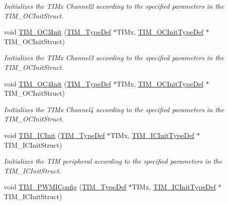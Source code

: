 \begin{DoxyCompactItemize}
\begin{DoxyCompactList}\small\item\em Initializes the T\+I\+Mx Channel2 according to the specified parameters in the T\+I\+M\+\_\+\+O\+C\+Init\+Struct. \end{DoxyCompactList}\item 
void \mbox{\hyperlink{group___t_i_m___exported___functions_ga90d4a358d4e6d4c5ed17dc1d6beb5f30}{T\+I\+M\+\_\+\+O\+C3\+Init}} (\mbox{\hyperlink{struct_t_i_m___type_def}{T\+I\+M\+\_\+\+Type\+Def}} $\ast$T\+I\+Mx, \mbox{\hyperlink{struct_t_i_m___o_c_init_type_def}{T\+I\+M\+\_\+\+O\+C\+Init\+Type\+Def}} $\ast$T\+I\+M\+\_\+\+O\+C\+Init\+Struct)
\begin{DoxyCompactList}\small\item\em Initializes the T\+I\+Mx Channel3 according to the specified parameters in the T\+I\+M\+\_\+\+O\+C\+Init\+Struct. \end{DoxyCompactList}\item 
void \mbox{\hyperlink{group___t_i_m___exported___functions_ga64571ebbb58cac39a9e760050175f11c}{T\+I\+M\+\_\+\+O\+C4\+Init}} (\mbox{\hyperlink{struct_t_i_m___type_def}{T\+I\+M\+\_\+\+Type\+Def}} $\ast$T\+I\+Mx, \mbox{\hyperlink{struct_t_i_m___o_c_init_type_def}{T\+I\+M\+\_\+\+O\+C\+Init\+Type\+Def}} $\ast$T\+I\+M\+\_\+\+O\+C\+Init\+Struct)
\begin{DoxyCompactList}\small\item\em Initializes the T\+I\+Mx Channel4 according to the specified parameters in the T\+I\+M\+\_\+\+O\+C\+Init\+Struct. \end{DoxyCompactList}\item 
void \mbox{\hyperlink{group___t_i_m___exported___functions_ga9e6a153dd6552e4e1188eba227316f7f}{T\+I\+M\+\_\+\+I\+C\+Init}} (\mbox{\hyperlink{struct_t_i_m___type_def}{T\+I\+M\+\_\+\+Type\+Def}} $\ast$T\+I\+Mx, \mbox{\hyperlink{struct_t_i_m___i_c_init_type_def}{T\+I\+M\+\_\+\+I\+C\+Init\+Type\+Def}} $\ast$T\+I\+M\+\_\+\+I\+C\+Init\+Struct)
\begin{DoxyCompactList}\small\item\em Initializes the T\+IM peripheral according to the specified parameters in the T\+I\+M\+\_\+\+I\+C\+Init\+Struct. \end{DoxyCompactList}\item 
void \mbox{\hyperlink{group___t_i_m___exported___functions_gaa71f9296556310f85628d6c748a06475}{T\+I\+M\+\_\+\+P\+W\+M\+I\+Config}} (\mbox{\hyperlink{struct_t_i_m___type_def}{T\+I\+M\+\_\+\+Type\+Def}} $\ast$T\+I\+Mx, \mbox{\hyperlink{struct_t_i_m___i_c_init_type_def}{T\+I\+M\+\_\+\+I\+C\+Init\+Type\+Def}} $\ast$T\+I\+M\+\_\+\+I\+C\+Init\+Struct)

\end{DoxyCompactItemize}
